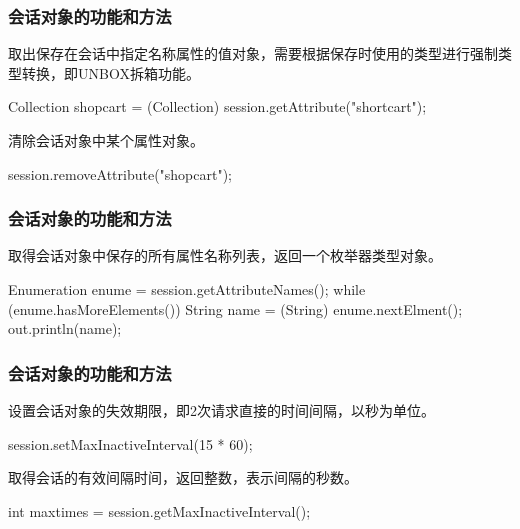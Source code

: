 \begin{frame}[fragile] %
\frametitle{会话对象的功能和方法} 


取出保存在会话中指定名称属性的值对象，需要根据保存时使用的类型进行{\hei\Blue 强制类型转换}，即UNBOX拆箱功能。

\begin{javaCode}
Collection shopcart = (Collection) session.getAttribute("shortcart");
\end{javaCode}


清除会话对象中某个属性对象。

\begin{javaCode}
session.removeAttribute("shopcart");
\end{javaCode}
\end{frame}

\begin{frame}[fragile] %
\frametitle{会话对象的功能和方法} 


取得会话对象中保存的所有属性名称列表，返回一个枚举器类型对象。
\begin{javaCode}
Enumeration enume = session.getAttributeNames();
while (enume.hasMoreElements()) {
  String name = (String) enume.nextElment();
  out.println(name);
}
\end{javaCode}
\end{frame}

\begin{frame}[fragile] %
\frametitle{会话对象的功能和方法} 


设置会话对象的失效期限，即2次请求直接的时间间隔，以秒为单位。
\begin{javaCode}
session.setMaxInactiveInterval(15 * 60);
\end{javaCode}


取得会话的有效间隔时间，返回整数，表示间隔的秒数。
\begin{javaCode}
int maxtimes = session.getMaxInactiveInterval();
\end{javaCode}
\end{frame}

